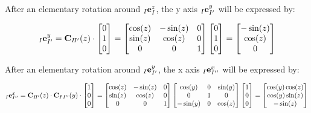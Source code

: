 \documentclass[10pt,landscape,a4paper]{article}
\newcommand\comat[2]{\vC_{#1\!#2}}
\begin{document}
\begin{multicols}{2}
After an elementary rotation around ${}_I \mathbf e^z_I$, the y axis ${}_I \mathbf e^y_{I'}$ will be expressed by:

\begin{equation}
{}_I \ve^y_{I'} = 
\comat{I}{I'}(z) 
\cdot
\begin{bmatrix}
0 \\ 1 \\ 0
\end{bmatrix}
=
\begin{bmatrix}
\cos(z) & -\sin(z) & 0 \\ 
\sin(z) &  \cos(z) & 0 \\ 
0 & 0 & 1
\end{bmatrix}
\begin{bmatrix}
0 \\ 1 \\ 0
\end{bmatrix}
=
\begin{bmatrix}
-\sin(z) \\ \cos(z) \\ 0
\end{bmatrix}
\end{equation}

After an elementary rotation around ${}_I \mathbf e^y_{I'}$, the x axis ${}_I \mathbf e^x_{I''}$ will be expressed by:

\begin{equation}
{}_I \ve^x_{I''} = 
\comat{I}{I'}(z) \cdot \comat{I}{'I''}(y)
\cdot
\begin{bmatrix}
1 \\ 0 \\ 0
\end{bmatrix}
=
\begin{bmatrix}
\cos(z) & -\sin(z) 	& 0 \\ 
\sin(z) &  \cos(z) 	& 0 \\ 
0	 	& 0 		& 1
\end{bmatrix}
\begin{bmatrix}
\cos(y) 	& 	0 	& \sin(y)	\\ 
0 			&  	1 	& 0 		\\ 
-\sin(y) 	& 	0 	& \cos(z)
\end{bmatrix}
\begin{bmatrix}
1 \\ 0 \\ 0
\end{bmatrix}
=
\begin{bmatrix}
\cos(y)\cos(z) \\ \cos(y)\sin(z) \\ -\sin(z)
\end{bmatrix}
\end{equation}


\end{multicols}
\end{document}
